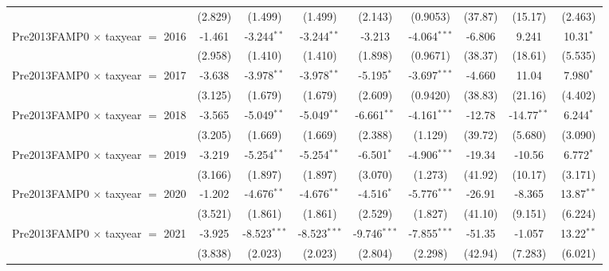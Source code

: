 {\begin{tabular}{lcccccccc}
                                           & (2.829)       & (1.499)        & (1.499)        & (2.143)        & (0.9053)       & (37.87)       & (15.17)       & (2.463)\\   
   Pre2013FAMP0 $\times$ taxyear $=$ 2016  & -1.461        & -3.244$^{**}$  & -3.244$^{**}$  & -3.213         & -4.064$^{***}$ & -6.806        & 9.241         & 10.31$^{*}$\\   
                                           & (2.958)       & (1.410)        & (1.410)        & (1.898)        & (0.9671)       & (38.37)       & (18.61)       & (5.535)\\   
   Pre2013FAMP0 $\times$ taxyear $=$ 2017  & -3.638        & -3.978$^{**}$  & -3.978$^{**}$  & -5.195$^{*}$   & -3.697$^{***}$ & -4.660        & 11.04         & 7.980$^{*}$\\   
                                           & (3.125)       & (1.679)        & (1.679)        & (2.609)        & (0.9420)       & (38.83)       & (21.16)       & (4.402)\\   
   Pre2013FAMP0 $\times$ taxyear $=$ 2018  & -3.565        & -5.049$^{**}$  & -5.049$^{**}$  & -6.661$^{**}$  & -4.161$^{***}$ & -12.78        & -14.77$^{**}$ & 6.244$^{*}$\\   
                                           & (3.205)       & (1.669)        & (1.669)        & (2.388)        & (1.129)        & (39.72)       & (5.680)       & (3.090)\\   
   Pre2013FAMP0 $\times$ taxyear $=$ 2019  & -3.219        & -5.254$^{**}$  & -5.254$^{**}$  & -6.501$^{*}$   & -4.906$^{***}$ & -19.34        & -10.56        & 6.772$^{*}$\\   
                                           & (3.166)       & (1.897)        & (1.897)        & (3.070)        & (1.273)        & (41.92)       & (10.17)       & (3.171)\\   
   Pre2013FAMP0 $\times$ taxyear $=$ 2020  & -1.202        & -4.676$^{**}$  & -4.676$^{**}$  & -4.516$^{*}$   & -5.776$^{***}$ & -26.91        & -8.365        & 13.87$^{**}$\\   
                                           & (3.521)       & (1.861)        & (1.861)        & (2.529)        & (1.827)        & (41.10)       & (9.151)       & (6.224)\\   
   Pre2013FAMP0 $\times$ taxyear $=$ 2021  & -3.925        & -8.523$^{***}$ & -8.523$^{***}$ & -9.746$^{***}$ & -7.855$^{***}$ & -51.35        & -1.057        & 13.22$^{**}$\\   
                                           & (3.838)       & (2.023)        & (2.023)        & (2.804)        & (2.298)        & (42.94)       & (7.283)       & (6.021)\\   

\end{tabular}}
